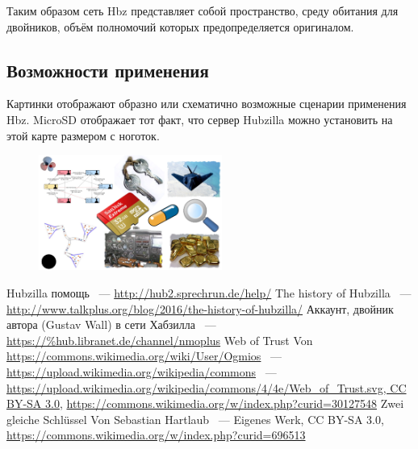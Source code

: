 \documentclass[10pt, a5paper]{article}
\begin{document}
Таким образом сеть Hbz представляет собой пространство, среду обитания для двойников, объём полномочий которых предопределяется оригиналом.

\subsection*{Возможности применения}

Картинки отображают образно или схематично возможные сценарии применения Hbz. MicroSD отображает тот факт, что сервер Hubzilla можно установить на этой карте размером с ноготок.

\begin{center}
\begin{figure}[h!]
  \centering
  \includegraphics[width=6cm]{Wall2.png}
  
  \label{Wall2}
\end{figure}
\end{center} 

\begin{thebibliography}{20}
 Hubzilla помощь ~--- \url{http://hub2.sprechrun.de/help/}
 The history of Hubzilla ~--- \url{http://www.talkplus.org/blog/2016/the-history-of-hubzilla/}
 Аккаунт, двойник автора (Gustav Wall) в сети Хабзилла ~--- \url{https://\%hub.libranet.de/channel/nmoplus}
 Web of Trust Von \url{https://commons.wikimedia.org/wiki/User/Ogmios} ~--- \url{https://upload.wikimedia.org/wikipedia/commons} ~--- \url{https://upload.wikimedia.org/wikipedia/commons/4/4e/Web\_of\_Trust.svg, CC BY-SA 3.0}, \url{https://commons.wikimedia.org/w/index.php?curid=30127548}
 Zwei gleiche Schlüssel Von Sebastian Hartlaub ~--- Eigenes Werk, CC BY-SA 3.0, \url{https://commons.wikimedia.org/w/index.php?curid=696513}
\end{thebibliography} 
\end{document}
